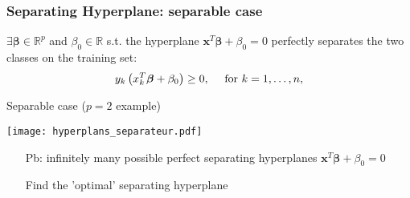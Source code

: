 \begin{frame}
  \frametitle{Separating Hyperplane: separable case}
  

  \medskip
  
  $\exists \boldsymbol{\beta}  \in \mathbb{R}^p$ and $\beta_0 \in \mathbb{R}$ s.t. the hyperplane 
  $\boldsymbol{x}^T \boldsymbol{\beta} + \beta_0 = 0$ 
  perfectly separates 
  the two classes on the training set:
  $$\begin{displaystyle}       y_k  \left(  x^T_k \boldsymbol{\beta} + \beta_0 \right) \ge 0, \quad \textrm{ for } k=1,\ldots,n,
  \end{displaystyle}$$

\begin{block}{Separable case ($p=2$ example)}
\begin{minipage}{.6\textwidth}
  \texttt{[image: hyperplans\_separateur.pdf]}
\end{minipage}
\begin{minipage}{.39\textwidth}
  \begin{itemize}
     \item[\alert{Pb:}] infinitely \alert{many} possible perfect \alert{separating hyperplanes} $\boldsymbol{x}^T\boldsymbol{\beta} + \beta_0=0$
     \item[\doigt] Find the 'optimal' separating hyperplane
  \end{itemize}
  \end{minipage}
\end{block}

\end{frame}

